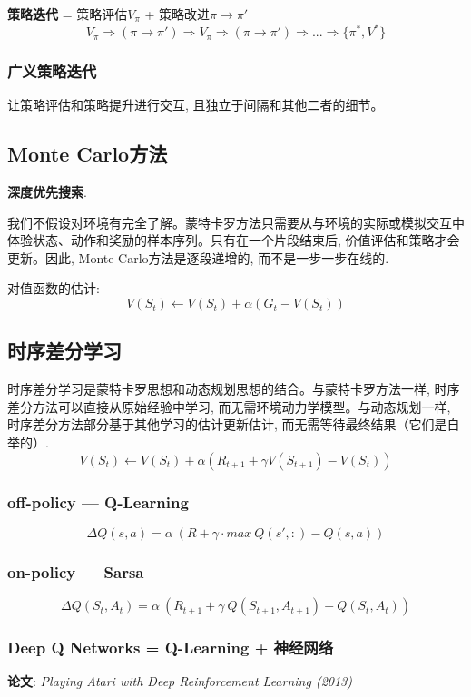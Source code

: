 \documentclass{article}
\begin{document}
            \textbf{策略迭代} = 策略评估$V_{\pi}$ + 策略改进$\pi \to \pi'$
                $$V_{\pi} \Rightarrow (\pi \to \pi') \Rightarrow V_{\pi} \Rightarrow (\pi \to \pi') \Rightarrow ... \Rightarrow \{\pi^*, V^*\}$$
        
        \subsubsection{广义策略迭代}
            让策略评估和策略提升进行交互, 且独立于间隔和其他二者的细节。
    
    \subsection{Monte Carlo方法}
        \textbf{深度优先搜索}.
    
        我们不假设对环境有完全了解。蒙特卡罗方法只需要从与环境的实际或模拟交互中体验状态、动作和奖励的样本序列。只有在一个片段结束后, 价值评估和策略才会更新。因此, Monte Carlo方法是逐段递增的, 而不是一步一步在线的.
        
        对值函数的估计:
            $$V\left(S_{t}\right) \leftarrow V\left(S_{t}\right)+\alpha\left(G_{t}-V\left(S_{t}\right)\right)$$

    \subsection{时序差分学习}
        时序差分学习是蒙特卡罗思想和动态规划思想的结合。与蒙特卡罗方法一样, 时序差分方法可以直接从原始经验中学习, 而无需环境动力学模型。与动态规划一样, 时序差分方法部分基于其他学习的估计更新估计, 而无需等待最终结果（它们是自举的）.
            $$V\left(S_{t}\right) \leftarrow V\left(S_{t}\right)+\alpha\left(R_{t+1}+\gamma V\left(S_{t+1}\right)-V\left(S_{t}\right)\right)$$
    
    	\subsubsection{off-policy --- Q-Learning}
    	    $$\Delta Q(s,a) = \alpha\ ( R + \gamma \cdot max\ Q(s',:) - Q(s,a))$$
    	    
    	\subsubsection{on-policy --- Sarsa}
    	    $$\Delta Q(S_{t},A_{t}) = \alpha\ ( R_{t+1} + \gamma\ Q(S_{t+1}, A_{t+1}) - Q(S_t, A_t))$$
    	
    	\subsubsection{Deep Q Networks = Q-Learning + 神经网络}
            \textbf{论文}: \textit{Playing Atari with Deep Reinforcement Learning (2013)}
        
\end{document}
